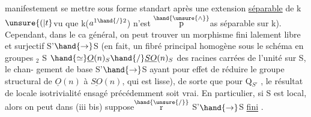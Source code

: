 
manifestement se mettre sous forme standart après une extension \uline{séparable}
de k $\unsure{(|t}$vu que k($a^{1\hand{/}2}$) n'est $\overset{\hand{\unsure{\wedge}}}{\mathrm{p}}$as séparable sur k). Cependant, dans le ca
 général, on peut trouver un morphisme fini  lalement
libre et surjectif S'$\hand{\to}$S (en fait, un fibré principal homogène sous
le schéma en groupes \hand{$\mu$}$_{2}$ S $\hand{\simeq}\underline{O}(n)_S\hand{/}\underline{SO}(n)_S$ des racines carrées
 de l'unité sur S,\hand{--} le chan-%
gement de base S'$\hand{\to}$S ayant pour effet de réduire le groupe structural de
$\underline{O}(n)$ à $\underline{SO}(n)$, qui est lisse), de sorte que pour Q$_{S'}$ , le résultat de
locale isotrivialité ensagé précédemment soit vrai. En particulier, si
S est local, alors on peut dans (iii bis) suppose$\overset{\hand{\unsure{/}}}{\mathrm{r}}$ S'$\hand{\to}$S \uline{fini} .

